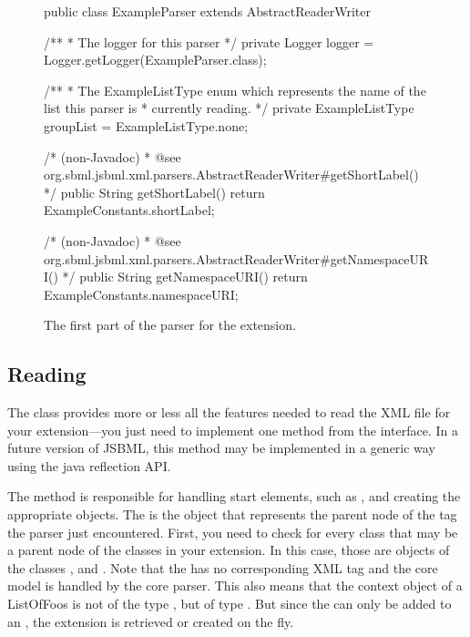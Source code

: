 \begin{figure}[htb]
  \begin{example}[numbers=left]
public class ExampleParser extends AbstractReaderWriter {

  /**
   * The logger for this parser
   */
  private Logger logger = Logger.getLogger(ExampleParser.class);

  /**
   * The ExampleListType enum which represents the name of the list this parser is
   * currently reading.
   */
  private ExampleListType groupList = ExampleListType.none;

  /* (non-Javadoc)
   * @see org.sbml.jsbml.xml.parsers.AbstractReaderWriter#getShortLabel()
   */
  public String getShortLabel() {
    return ExampleConstants.shortLabel;
  }

  /* (non-Javadoc)
   * @see org.sbml.jsbml.xml.parsers.AbstractReaderWriter#getNamespaceURI()
   */
  public String getNamespaceURI() {
    return ExampleConstants.namespaceURI;
  }

}\end{example}
 \caption{The first part of the parser for the extension.}
 \label{lst:ModelExtParserClass}
\end{figure}


\subsection{Reading}

The class  provides more or less all the 
features needed to read the XML file for your extension---you just need to implement one
method from the  interface. In a future version of JSBML, this method
may be implemented in a generic way using the java reflection API.

The  method is responsible for handling start
elements, such as , and creating the appropriate
objects.  The  is the object that represents the parent
node of the tag the parser just encountered.  First, you need to check for
every class that may be a parent node of the classes in your extension.  In
this case, those are objects of the classes \Model,  and
.  Note that the  has no corresponding XML
tag and the core model is handled by the core parser.  This also
means that the context object of a ListOfFoos is not of the type
, but of type \Model.  But since the 
can only be added to an , the extension is retrieved or
created on the fly.

